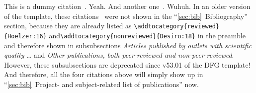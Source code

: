 \documentclass[ngerman]{scrartcl}
\begin{document}
This is a dummy citation~\cite{Hoelzer:17}. Yeah. And another one~\cite{Gerst:18}. Wuhuh. In an older version of the template, these citations~\cite{Hoelzer:16, Desiro:18} were not shown in the ``\ref{sec:bib}~Bibliography'' section, because they are already listed as \verb=\addtocategory{reviewed}{Hoelzer:16}= and\verb=\addtocategory{nonreviewed}{Desiro:18}= in the preamble and therefore shown in subsubsections \emph{Articles published by outlets with scientific quality \dots} and \emph{Other publications, both peer-reviewed and non-peer-reviewed}. However, these subsubsections are deprecated since v53.01 of the DFG template! And therefore, all the four citations above will simply show up in ``\ref{sec:bib}~Project- and subject-related list of publications'' now.

\lipsum[1]



\end{document}
